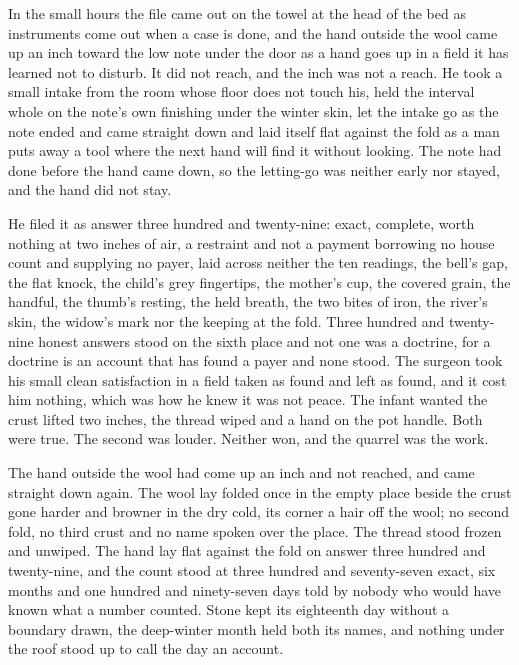 In the small hours the file came out on the towel at the head of the bed as instruments come out when a case is done, and the hand outside the wool came up an inch toward the low note under the door as a hand goes up in a field it has learned not to disturb. It did not reach, and the inch was not a reach. He took a small intake from the room whose floor does not touch his, held the interval whole on the note's own finishing under the winter skin, let the intake go as the note ended and came straight down and laid itself flat against the fold as a man puts away a tool where the next hand will find it without looking. The note had done before the hand came down, so the letting-go was neither early nor stayed, and the hand did not stay.

He filed it as answer three hundred and twenty-nine: exact, complete, worth nothing at two inches of air, a restraint and not a payment borrowing no house count and supplying no payer, laid across neither the ten readings, the bell's gap, the flat knock, the child's grey fingertips, the mother's cup, the covered grain, the handful, the thumb's resting, the held breath, the two bites of iron, the river's skin, the widow's mark nor the keeping at the fold. Three hundred and twenty-nine honest answers stood on the sixth place and not one was a doctrine, for a doctrine is an account that has found a payer and none stood. The surgeon took his small clean satisfaction in a field taken as found and left as found, and it cost him nothing, which was how he knew it was not peace. The infant wanted the crust lifted two inches, the thread wiped and a hand on the pot handle. Both were true. The second was louder. Neither won, and the quarrel was the work.

The hand outside the wool had come up an inch and not reached, and came straight down again. The wool lay folded once in the empty place beside the crust gone harder and browner in the dry cold, its corner a hair off the wool; no second fold, no third crust and no name spoken over the place. The thread stood frozen and unwiped. The hand lay flat against the fold on answer three hundred and twenty-nine, and the count stood at three hundred and seventy-seven exact, six months and one hundred and ninety-seven days told by nobody who would have known what a number counted. Stone kept its eighteenth day without a boundary drawn, the deep-winter month held both its names, and nothing under the roof stood up to call the day an account.

